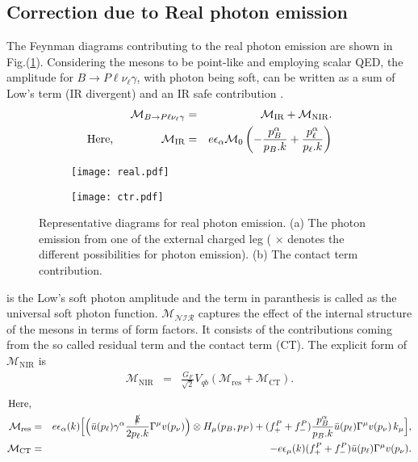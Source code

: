 \documentclass[a4paper,11pt]{article}
\begin{document}
	\subsection{Correction due to Real photon emission}
	\label{subsec1}
	The Feynman diagrams contributing to the real photon emission are shown in Fig.(\ref{fig2}). Considering the mesons to be point-like and employing scalar QED, the amplitude for $B \rightarrow P \ell \nu_\ell \gamma$, with photon being soft, can be written as a sum of Low's term \cite{PhysRev.110.974} (IR divergent) and 
	an IR safe contribution \cite{Isidori:2007zt}.
	\begin{eqnarray}
	\mathcal{M}_{B\to P \ell \nu_{\ell} \gamma} &=&\mathcal{M}_{\text{IR}}+\mathcal{M}_{\text{NIR}}.\\ 
	\label{eqnm1}
	\text{Here,} \hspace{1.5cm}\mathcal{M}_{\text{IR}}&=&e \epsilon_{\alpha} \mathcal{M}_{0} \left(-\frac{p_{B}^{\alpha}}{p_{B}.k}+\frac{p_{\ell}^{\alpha}}{p_{\ell}.k}\right)
	\end{eqnarray}
	 \begin{figure}[h]
	 	\begin{subfigure}{.5\textwidth}
	 		\centering
	 		\texttt{[image: real.pdf]}
	 		\caption{}
	 	\end{subfigure}%
	 	\begin{subfigure}{.5\textwidth}
	 		\centering
	 		\texttt{[image: ctr.pdf]}
	 		\caption{}
	 	\end{subfigure}
	 	\caption{Representative diagrams for real photon emission. (a) The photon emission from one of the external charged leg ({\color{red} $\times$} denotes the different possibilities for photon emission). (b) The contact term contribution.}
	 	\label{fig2}
	 \end{figure} 
	is the Low's soft photon amplitude and the term in paranthesis is called as the universal soft photon function. $\mathcal{M_{\text{NIR}}}$ captures the effect of the internal structure of the mesons in terms of form factors. It consists of the contributions coming from the so called residual term and the contact term (CT).
	The explicit form of $\mathcal{M}_{\text{NIR}}$ is
	\begin{eqnarray}
	\mathcal{M}_{\text{NIR}}&=&\frac{G_{F}}{\sqrt{2}}V_{qb}( \mathcal{M}_{\text{res}} + \mathcal{M}_{\text{CT}}).
	\label{eqnn}
	\end{eqnarray}
	\begin{eqnarray}
	\text{Here,}\nonumber\\
	\mathcal{M}_{\text{res}} &=&e\epsilon_{\alpha}(k)\Big[\Big(\bar{u}(p_{\ell})\gamma^{\alpha}\frac{\slashed{k}}{2p_{\ell}.k}\Gamma^{\mu}v(p_{\nu}) \Big)\otimes H_{\mu}(p_{B},p_{P})+(f_{+}^P+f_{-}^P)\frac{p_{B}^{\alpha}}{p_{B}.k} \bar{u}(p_{\ell})\Gamma^{\mu}v(p_{\nu})\, k_{\mu} \Big],\nonumber\\
	 \mathcal{M}_{\text{CT}}&=& - e\epsilon_{\mu}(k) (f_{+}^P+f_{-}^P) \bar{u}(p_{\ell})\Gamma^{\mu}v(p_{\nu}).
	\end{eqnarray}
\end{document}
